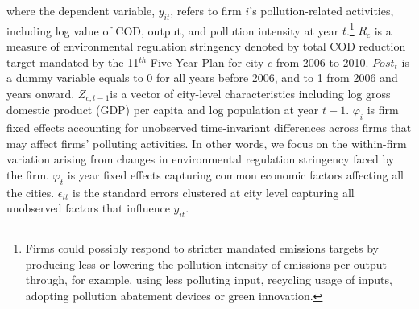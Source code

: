 \documentclass[12pt,english]{article}
\begin{document}
where the dependent variable, $y_{it}$, refers to firm $i$'s pollution-related activities, including log value of COD, output, and pollution intensity at year $t$.\footnote{Firms could possibly respond to stricter mandated emissions targets by producing less or lowering the pollution intensity of emissions per output through, for example, using less polluting input, recycling usage of inputs, adopting pollution abatement devices or green innovation.} ${R}_{c} $ is a measure of environmental regulation stringency denoted by total COD reduction target mandated by the 11$^{th}$ Five-Year Plan for city $c$ from 2006 to 2010. ${Post}_{t} $ is a dummy variable equals to 0 for all years before 2006, and to 1 from 2006 and years onward. $Z_{c, t-1} $is a vector of city-level characteristics including log gross domestic product (GDP) per capita and log population at year $t-1$. $\varphi_i$ is firm fixed effects accounting for unobserved time-invariant differences across firms that may affect firms' polluting activities. In other words, we focus on the within-firm variation arising from changes in environmental regulation stringency faced by the firm. $\varphi_{t}$ is year fixed effects capturing common economic factors affecting all the cities. $\epsilon_{it}$ is the standard errors clustered at city level capturing all unobserved factors that influence $y_{it}$.
\end{document}
